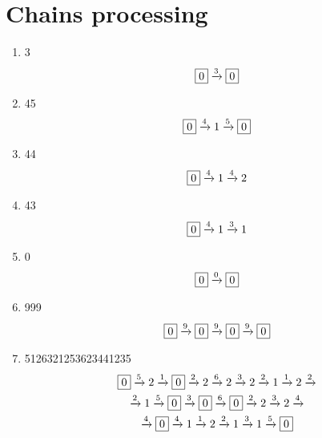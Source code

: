 \documentclass[12pt]{article}
\begin{document}
\section* {Chains processing} 
\begin {enumerate} 
\item 3
\begin {equation*} 
\begin {gathered} 
\fbox{0} \xrightarrow{3} \fbox{0}
\end {gathered} 
\end {equation*} 

\item 45
\begin {equation*} 
\begin {gathered} 
\fbox{0} \xrightarrow{4} 1 \xrightarrow{5} \fbox{0}
\end {gathered} 
\end {equation*} 

\item 44
\begin {equation*} 
\begin {gathered} 
\fbox{0} \xrightarrow{4} 1 \xrightarrow{4} 2
\end {gathered} 
\end {equation*} 

\item 43
\begin {equation*} 
\begin {gathered} 
\fbox{0} \xrightarrow{4} 1 \xrightarrow{3} 1
\end {gathered} 
\end {equation*} 

\item 0
\begin {equation*} 
\begin {gathered} 
\fbox{0} \xrightarrow{0} \fbox{0}
\end {gathered} 
\end {equation*} 

\item 999
\begin {equation*} 
\begin {gathered} 
\fbox{0} \xrightarrow{9} \fbox{0} \xrightarrow{9} \fbox{0} \xrightarrow{9} \fbox{0}
\end {gathered} 
\end {equation*} 

\item 5126321253623441235
\begin {equation*} 
\begin {gathered} 
\fbox{0} \xrightarrow{5} 2 \xrightarrow{1} \fbox{0} \xrightarrow{2} 2 \xrightarrow{6} 2 \xrightarrow{3} 2 \xrightarrow{2} 1 \xrightarrow{1} 2 \xrightarrow{2} \\
 \xrightarrow{2} 1 \xrightarrow{5} \fbox{0} \xrightarrow{3} \fbox{0} \xrightarrow{6} \fbox{0} \xrightarrow{2} 2 \xrightarrow{3} 2 \xrightarrow{4} \\
 \xrightarrow{4} \fbox{0} \xrightarrow{4} 1 \xrightarrow{1} 2 \xrightarrow{2} 1 \xrightarrow{3} 1 \xrightarrow{5} \fbox{0}
\end {gathered} 
\end {equation*} 


\end{enumerate}
\end{document}
